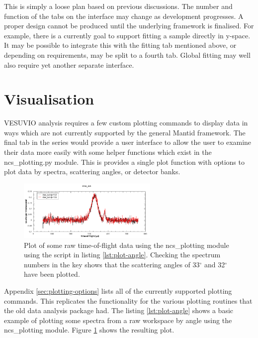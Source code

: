 \documentclass[paper=a4, fontsize=11pt]{scrartcl}	%
\numberwithin{equation}{section}															%
\numberwithin{figure}{section}																%
\numberwithin{table}{section}
\begin{document}
This is simply a loose plan based on previous discussions. The number and function of the tabs on the interface may change as development progresses. A proper design cannot be produced until the underlying framework is finalised. For example, there is a currently goal to support fitting a sample directly in y-space. It may be possible to integrate this with the fitting tab mentioned above, or depending on requirements, may be split to a fourth tab. Global fitting may well also require yet another separate interface.

\section{Visualisation}
\label{sec:visualisation}
VESUVIO analysis requires a few custom plotting commands to display data in ways which are not currently supported by the general Mantid framework. The final tab in the series would provide a user interface to allow the user to examine their data more easily with some helper functions which exist in the ncs\_plotting.py module. This is provides a single plot function with options to plot data by spectra, scattering angles, or detector banks.

\begin{figure}[H]
\centering
\includegraphics[width=0.6\textwidth]{img/plot-angle.png}
\caption{Plot of some raw time-of-flight data using the ncs\_plotting module using the script in listing \ref{lst:plot-angle}. Checking the spectrum numbers in the key shows that the scattering angles of 33$^\circ$ and 32$^\circ$ have been plotted.}
\label{fig:plot-angle}
\end{figure}

Appendix \ref{sec:plotting-options} lists all of the currently supported plotting commands. This replicates the functionality for the various plotting routines that the old data analysis package had. The listing \ref{lst:plot-angle} shows a basic example of plotting some spectra from a raw workspace by angle using the ncs\_plotting module. Figure \ref{fig:plot-angle} shows the resulting plot.
\end{document}
